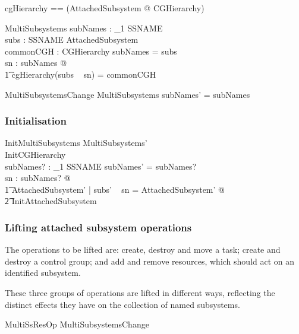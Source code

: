 \documentclass[a4paper,twoside,12pt]{article}
\begin{document}
\begin{zed}
cgHierarchy == (\lambda AttachedSubsystem @ \theta CGHierarchy) 
\end{zed}


\begin{schema}{MultiSubsystems}
subNames : \finset_1 SSNAME \\
subs : SSNAME \ffun AttachedSubsystem \\
commonCGH : CGHierarchy
\where
subNames = \dom subs \\
\forall sn : subNames @ \\
    \t1 cgHierarchy(subs ~ sn) = commonCGH
\end{schema}

\begin{schema}{MultiSubsystemsChange}
\Delta MultiSubsystems
\where
subNames' = subNames
\end{schema}

\subsubsection{Initialisation}

\begin{schema}{InitMultiSubsystems}
MultiSubsystems' \\
InitCGHierarchy \\
subNames? : \finset_1 SSNAME 
\where
subNames' = subNames? \\
\forall sn : subNames? @ \\
\t1 \exists AttachedSubsystem' | subs' ~ sn = \theta AttachedSubsystem' @ \\
    \t2 InitAttachedSubsystem
\end{schema}


\subsubsection{Lifting attached subsystem operations}

The operations to be lifted are: create,  destroy and move a task;
create and destroy a control group; and add and remove resources, which should act on an 
identified subsystem.

These three groups of operations are lifted in different ways, reflecting the distinct effects they have on the 
collection of named subsystems.

\begin{schema}{MultiSsResOp}
MultiSubsystemsChange \\

\end{schema}
\end{document}
